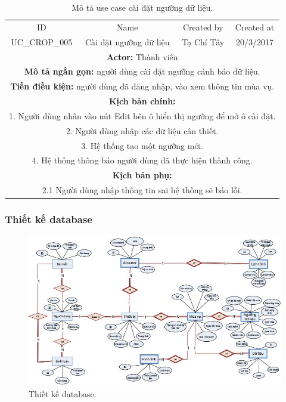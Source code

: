 \documentclass[a4paper,12pt,oneside]{article}
\begin{document}
\newpage
\begin{table}[!htp]
\centering
\begin{tabularx}{\linewidth}{ |c||c|c|c| }
\hline
ID & Name & Created by & Created at\\
UC\_CROP\_005 & Cài đặt ngưỡng dữ liệu & Tạ Chí Tây & 20/3/2017\\
\hline
\multicolumn{4}{|X|}{\textbf{Actor:} Thành viên }\\
\hline
\multicolumn{4}{|X|}{\textbf{Mô tả ngắn gọn:} người dùng cài đặt ngưỡng cảnh báo dữ liệu. }\\
\hline
\multicolumn{4}{|X|}{\textbf{Tiền điều kiện:} người dùng đã đăng nhập, vào xem thông tin mùa vụ.}\\
\hline
\multicolumn{4}{|X|}{\textbf{Kịch bản chính:}}\\
\multicolumn{4}{|X|}{ 1.	Người dùng nhấn vào nút Edit bên ô hiển thị ngưỡng để mở ô cài đặt.}\\
\multicolumn{4}{|X|}{
2.	Người dùng nhập các dữ liệu cân thiết.}\\
\multicolumn{4}{|X|}{
3.	Hệ thống tạo một ngưỡng mới.}\\

\multicolumn{4}{|X|}{4. Hệ thống thông báo người dùng đã thực hiện thành công.}\\
\hline
\multicolumn{4}{|X|}{\textbf{Kịch bản phụ:}}\\
\multicolumn{4}{|X|}{2.1    Người dùng nhập thông tin sai hệ thống sẽ báo lỗi.}\\
\hline

\end{tabularx}
\caption{Mô tả use case cài đặt ngưỡng dữ liệu.}
\end{table}

\subsubsection{Thiết kế database}

\begin{landscape}
\begin{figure}[b]
	\includegraphics[scale=1.1]{hinh/database.jpg}
	\caption{Thiết kế database.}
	\label{xyz}
\end{figure}
\end{landscape}
\end{document}
